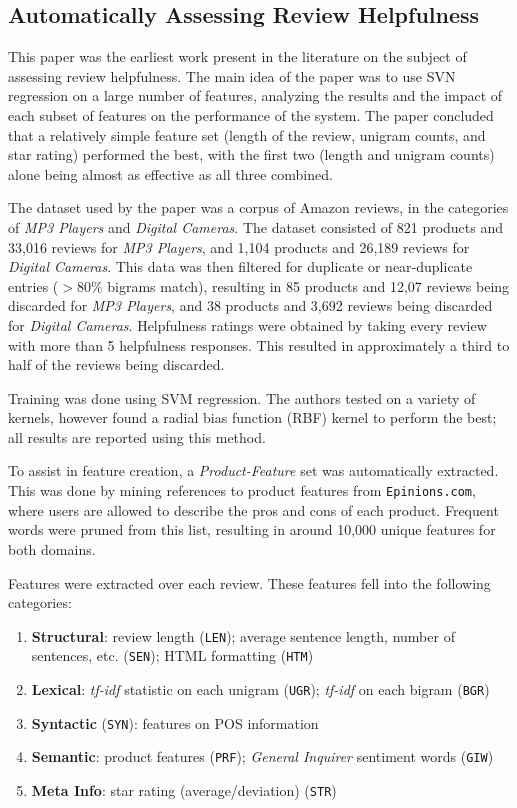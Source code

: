 \documentclass[12pt,letterpaper]{article}
\begin{document}
\subsection{Automatically Assessing Review Helpfulness \cite{2006kim-helpfulness}}
This paper was the earliest work present in the literature on the subject of assessing review helpfulness.
The main idea of the paper was to use SVN regression on a large number of features,
	analyzing the results and the impact of each subset of features on the performance
	of the system.
The paper concluded that a relatively simple feature set (length of the review,
	unigram counts, and star rating) performed the best, with the first two
	(length and unigram counts) alone being almost as effective as all three
	combined.

The dataset used by the paper was a corpus of Amazon reviews, in the categories
	of {\em MP3 Players} and {\em Digital Cameras}.
The dataset consisted of 821 products and 33,016 reviews for {\em MP3 Players},
	and 1,104 products and 26,189 reviews for {\em Digital Cameras}.
This data was then filtered for duplicate or near-duplicate entries ($>80\%$ bigrams match),
	resulting in 85 products and 12,07 reviews being discarded for {\em MP3 Players},
	and 38 products and 3,692 reviews being discarded for {\em Digital Cameras}.
Helpfulness ratings were obtained by taking every review with more than 5 helpfulness
	responses.
This resulted in approximately a third to half of the reviews being discarded.

Training was done using SVM regression.
The authors tested on a variety of kernels, however found a radial bias function (RBF)
	kernel to perform the best; all results are reported using this method.

To assist in feature creation, a {\em Product-Feature} set was automatically extracted.
This was done by mining references to product features from {\tt Epinions.com},
	where users are allowed to describe the pros and cons of each product.
Frequent words were pruned from this list, resulting in around 10,000 unique features
	for both domains.

Features were extracted over each review.
These features fell into the following categories:
\begin{enumerate}
	\item {\bf Structural}: review length ({\tt LEN}); average sentence length, 
		number of sentences, etc. ({\tt SEN}); 
		HTML formatting ({\tt HTM})
	\item {\bf Lexical}: {\it tf-idf} statistic on each unigram ({\tt UGR});
		{\it tf-idf} on each bigram ({\tt BGR})
	\item {\bf Syntactic} ({\tt SYN}): features on POS information
	\item {\bf Semantic}: product features ({\tt PRF}); 
		{\it General Inquirer} sentiment words ({\tt GIW}) 
	\item {\bf Meta Info}: star rating (average/deviation) ({\tt STR})
\end{enumerate}
\end{document}

